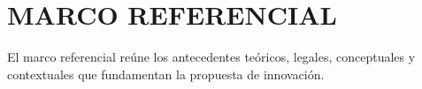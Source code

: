 \chapter{MARCO REFERENCIAL}
\label{chap:marco_referencial}

El marco referencial reúne los antecedentes teóricos, legales, conceptuales y contextuales que fundamentan la propuesta de innovación.




